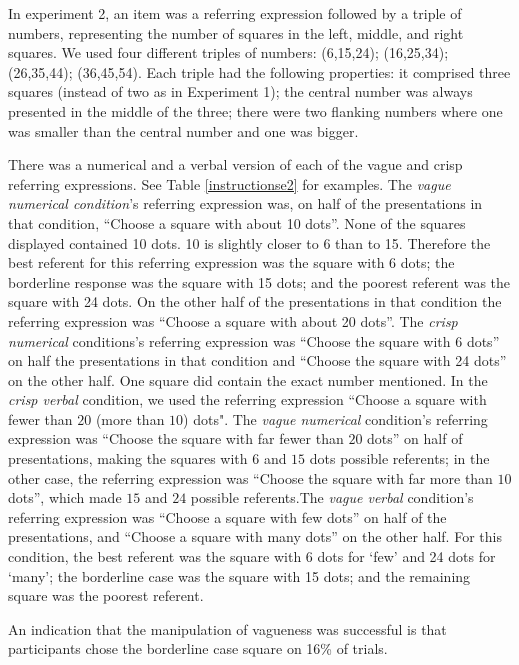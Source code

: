 \documentclass[
a4paper 
, doc
, longtable
]{apa6}
\begin{document}
In experiment 2, an item was a referring expression followed by a triple of numbers, representing the number of squares in the left, middle, and right squares. We used four different triples of numbers: (6,15,24); (16,25,34); (26,35,44); (36,45,54). Each triple had the following properties: it comprised three squares (instead of two as in Experiment 1); the central number was always presented in the middle of the three; there were two flanking numbers where one was smaller than the central number and one was bigger. 

There was a numerical and a verbal version of each of the vague and crisp referring expressions. See Table \ref{instructionse2} for examples.
The {\em vague numerical condition}'s referring expression was, on half of the presentations in that condition, ``Choose a square with about 10 dots''. None of the squares displayed contained 10 dots. 10 is slightly closer to 6 than to 15. Therefore the best referent for this referring expression was the square with 6 dots;  the borderline response was the square with 15 dots; and the poorest referent was the square with 24 dots. On the other half of the presentations in that condition the referring expression was ``Choose a square with about 20 dots''. The {\em crisp numerical} conditions's referring expression was ``Choose the square with 6 dots'' on half the presentations in that condition and ``Choose the square with 24 dots'' on the other half. One square did contain the exact number mentioned.  In the {\em crisp verbal} condition, we used the referring expression ``Choose a square with fewer than $20$ (more than $10$) dots".  The {\em vague numerical} condition's referring expression was ``Choose the square with far fewer than $20$ dots'' on half of presentations, making the squares with 6 and $15$ dots possible referents; in the other case, the referring expression was ``Choose the square with far more than $10$ dots'', which made $15$ and $24$ possible referents.The {\em vague verbal} condition's referring expression was ``Choose a square with few dots'' on half of the presentations, and ``Choose a square with many dots'' on the other half. For this condition, the best referent was the square with 6 dots for `few' and 24 dots for `many'; the borderline case was the square with 15 dots; and the remaining square was the poorest referent. 

An indication that the manipulation of vagueness was successful is that participants chose the borderline case square on 16\% of trials.
\end{document}
